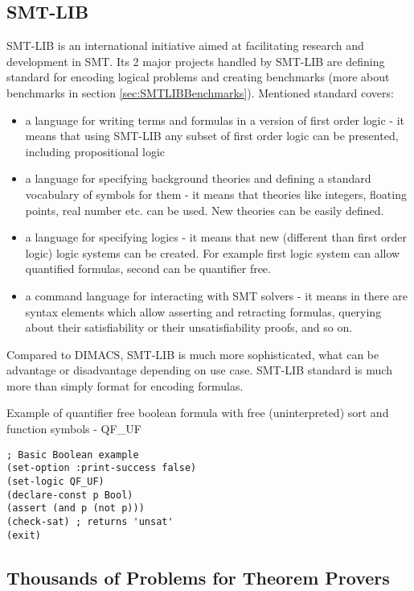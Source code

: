 \subsection{SMT-LIB}
\label{sec:SMTLIB}

SMT-LIB \cite{BarFT-RR-17} is an international initiative aimed at facilitating research and development in \gls{SMT}. Its 2 major projects handled by SMT-LIB are defining standard for encoding logical problems and creating benchmarks (more about benchmarks in section \ref{sec:SMTLIBBenchmarks}). Mentioned standard covers:

\begin{itemize}
  \item a language for writing terms and formulas in a version of first order logic - it means that using SMT-LIB any subset of first order logic can be presented, including propositional logic
  \item a language for specifying background theories and defining a standard vocabulary of symbols for them - it means that theories like integers, floating points, real number etc. can be used. New theories can be easily defined.
  \item a language for specifying logics - it means that new (different than first order logic) logic systems can be created. For example first logic system can allow quantified formulas, second can be quantifier free.
  \item a command language for interacting with SMT solvers - it means in there are syntax elements which allow asserting and retracting formulas, querying about their satisfiability or their unsatisfiability proofs, and so on.
\end{itemize}

Compared to DIMACS, SMT-LIB is much more sophisticated, what can be advantage or disadvantage depending on use case. SMT-LIB standard is much more than simply format for encoding formulas.

\begin{listing}[H]
  \caption{Example of quantifier free boolean formula with free (uninterpreted) sort and function symbols - QF\_UF}
  \label{lis:SMTLIBExample}
  \begin{verbatim}
; Basic Boolean example
(set-option :print-success false)
(set-logic QF_UF)
(declare-const p Bool)
(assert (and p (not p))) 
(check-sat) ; returns 'unsat'
(exit)
  \end{verbatim}
\end{listing}

\subsection{Thousands of Problems for Theorem Provers}
\label{sec:TPTP}

